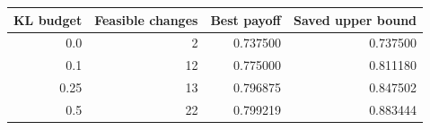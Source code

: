 \begin{tabular}{rrrr}
\toprule
KL budget & Feasible changes & Best payoff & Saved upper bound \\
\midrule
0.0 & 2 & 0.737500 & 0.737500 \\
0.1 & 12 & 0.775000 & 0.811180 \\
0.25 & 13 & 0.796875 & 0.847502 \\
0.5 & 22 & 0.799219 & 0.883444 \\
\bottomrule
\end{tabular}
